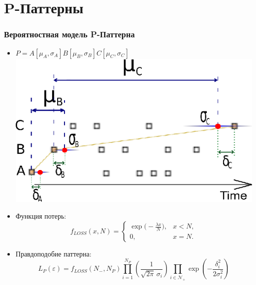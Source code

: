 \documentclass[smaller]{beamer}
\begin{document}
\section{P-Паттерны}
\begin{frame}
\frametitle{Вероятностная модель P-Паттерна}
 \begin{itemize}
  \item $P=A[\mu_A,\sigma_A]B[\mu_B,\sigma_B]C[\mu_C,\sigma_C]$\\
 \includegraphics[scale=0.6]{il1.eps} \\
  \item Функция потерь:
        $$
  f_{LOSS}(x,N)= \begin{cases}
   \exp\bigl(-\frac{\lambda x}{N}\bigr), & x < N, \\
   0,                                    & x=N.
   \end{cases}
  $$
  \item Правдоподобие паттерна:
$$L_{P}(\varepsilon)=
f_{LOSS}(N_-,N_{P})
\prod_{i=1}^{N_{P}}\left( \frac1{\sqrt{2\pi}\,\sigma_i }\right) 
\prod_{i\in \mathcal{N}_+}\exp\left(- \frac{\delta_i^2}{2\sigma_i^2}\right) 
$$
 \end{itemize}
\end{frame}  
\end{document}
